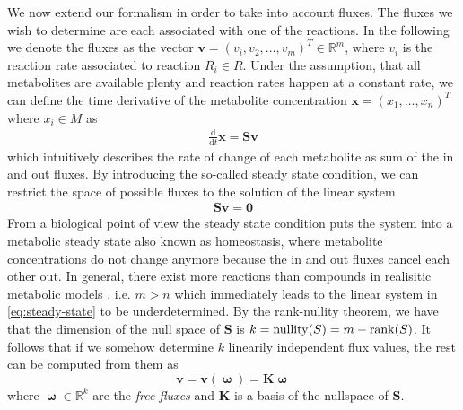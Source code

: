\documentclass[10pt]{article}
\newcommand{\mb}[1]{\mathbf{#1}}
\DeclareMathOperator\nullity{\mathrm{nullity}}
\DeclareMathOperator\bomega{\boldsymbol{\omega}}
\begin{document}

We now extend our formalism in order to take into account fluxes.
The fluxes we wish to determine are each associated with one of the reactions.
In the following we denote the fluxes as the vector $\mb{v}=(v_i, v_2, \dots, v_m)^T \in \mathbb{R}^m$, 
where $v_i$ is the reaction rate associated to reaction $R_i \in R$.
Under the assumption, that all metabolites are available plenty and reaction rates happen at a constant rate, 
we can define the time derivative of the metabolite concentration $\mb{x}=(x_1, \dots, x_n)^T$ where $x_i \in M$ as
\begin{align}
    \frac{\mathrm{d}}{\mathrm{d}t}\mb{x} = \mb{S}\mb{v}
\end{align}
which intuitively describes the rate of change of each metabolite as sum of the in and out fluxes.
By introducing the so-called steady state condition, we can restrict the space of possible fluxes to the solution of the linear system
\begin{align}
    \mb{S}\mb{v} = \mb{0} \label{eq:steady-state}
\end{align}
From a biological point of view the steady state condition puts the system into a metabolic steady state also known as homeostasis, 
where metabolite concentrations do not change anymore because the in and out fluxes cancel each other out.
In general, there exist more reactions than compounds in realisitic metabolic models \cite{noeh15, orth10}, 
i.e. $m > n$ which immediately leads to the linear system in \ref{eq:steady-state} to be underdetermined.
By the rank-nullity theorem, we have that the dimension of the null space of $\mb{S}$ is $k = \nullity(S) = m - \rank(S)$.
It follows that if we somehow determine $k$ linearily independent flux values, the rest can be computed from them as
\[
    \mb{v} = \mb{v}(\bomega) = \mb{K}\bomega
\]
where $\bomega \in \mathbb{R}^k$ are the \emph{free fluxes} and $\mb{K}$ is a basis of the nullspace of $\mb{S}$.
\end{document}

